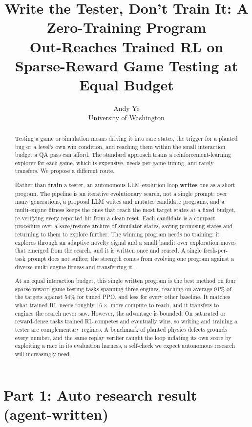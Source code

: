 \documentclass[11pt]{article}
\title{Write the Tester, Don't Train It: A Zero-Training Program\\Out-Reaches Trained RL on Sparse-Reward Game Testing at Equal Budget}
\author{Andy Ye \\ University of Washington}
\begin{document}
\maketitle
\begin{abstract}
Testing a game or simulation means driving it into rare states, the trigger for a planted bug or a level's own win
condition, and reaching them within the small interaction budget a QA pass can afford. The standard approach trains a
reinforcement-learning explorer for each game, which is expensive, needs per-game tuning, and rarely transfers. We propose
a different route.

Rather than \textbf{train} a tester, an autonomous LLM-evolution loop \textbf{writes} one as a short program. The pipeline
is an iterative evolutionary search, not a single prompt: over many generations, a proposal LLM writes and mutates
candidate programs, and a multi-engine fitness keeps the ones that reach the most target states at a fixed budget,
re-verifying every reported hit from a clean reset. Each candidate is a compact procedure over a save/restore archive of
simulator states, saving promising states and returning to them to explore further. The winning program needs no training:
it explores through an adaptive novelty signal and a small bandit over exploration moves that emerged from the search, and
it is written once and reused. A single fresh-per-task prompt does not suffice; the strength comes from evolving one
program against a diverse multi-engine fitness and transferring it.

At an equal interaction budget, this single written program is the best method on four sparse-reward game-testing tasks
spanning three engines, reaching on average $91\%$ of the targets against $54\%$ for tuned PPO, and less for every other
baseline. It matches what trained RL needs roughly $16\times$ more compute to reach, and it transfers to engines the search
never saw. However, the advantage is bounded. On saturated or reward-dense tasks trained RL competes and eventually wins,
so writing and training a tester are complementary regimes. A benchmark of planted physics defects grounds every number,
and the same replay verifier caught the loop inflating its own score by exploiting a race in its evaluation harness, a
self-check we expect autonomous research will increasingly need.
\end{abstract}

\section*{Part 1: Auto research result (agent-written)}
\end{document}
